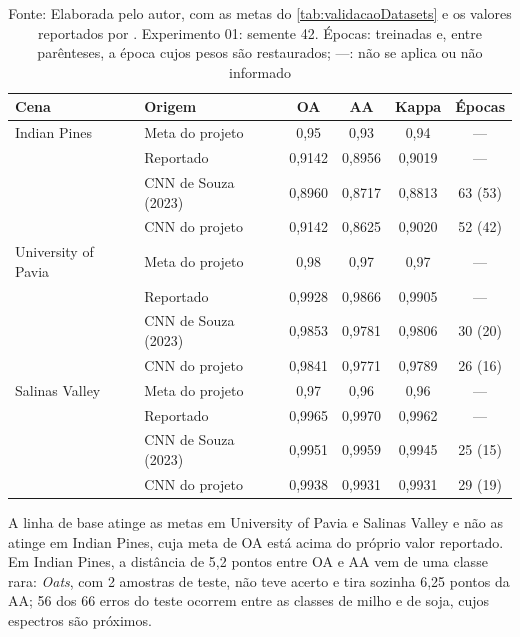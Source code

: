 \begin{table}[H]
    \centering
    \footnotesize
    \caption{Metas do projeto, valores reportados por Souza (2023) e valores do experimento 01}
    \begin{tabular}{|l|l|c|c|c|c|}
        \hline
        \rowcolor[HTML]{C0C0C0}
        \textbf{Cena} & \textbf{Origem} & \textbf{OA} & \textbf{AA} & \textbf{Kappa} & \textbf{Épocas} \\
        \hline
        Indian Pines & Meta do projeto & 0,95 & 0,93 & 0,94 & --- \\
                     & Reportado & 0,9142 & 0,8956 & 0,9019 & --- \\
                     & CNN de Souza (2023) & 0,8960 & 0,8717 & 0,8813 & 63 (53) \\
                     & CNN do projeto & 0,9142 & 0,8625 & 0,9020 & 52 (42) \\
        \hline
        University of Pavia & Meta do projeto & 0,98 & 0,97 & 0,97 & --- \\
                            & Reportado & 0,9928 & 0,9866 & 0,9905 & --- \\
                            & CNN de Souza (2023) & 0,9853 & 0,9781 & 0,9806 & 30 (20) \\
                            & CNN do projeto & 0,9841 & 0,9771 & 0,9789 & 26 (16) \\
        \hline
        Salinas Valley & Meta do projeto & 0,97 & 0,96 & 0,96 & --- \\
                       & Reportado & 0,9965 & 0,9970 & 0,9962 & --- \\
                       & CNN de Souza (2023) & 0,9951 & 0,9959 & 0,9945 & 25 (15) \\
                       & CNN do projeto & 0,9938 & 0,9931 & 0,9931 & 29 (19) \\
        \hline
    \end{tabular}
    \captionsetup{justification=raggedright}
    \caption*{Fonte: Elaborada pelo autor, com as metas do \autoref{tab:validacaoDatasets} e os valores reportados por . Experimento 01: semente 42. Épocas: treinadas e, entre parênteses, a época cujos pesos são restaurados; ---: não se aplica ou não informado}
    \label{tab:linhaBase}
\end{table}

A linha de base atinge as metas em University of Pavia e Salinas Valley e não as atinge em Indian Pines, cuja meta de OA está acima do próprio valor reportado. Em Indian Pines, a distância de 5,2 pontos entre OA e AA vem de uma classe rara: \textit{Oats}, com 2 amostras de teste, não teve acerto e tira sozinha 6,25 pontos da AA; 56 dos 66 erros do teste ocorrem entre as classes de milho e de soja, cujos espectros são próximos.

